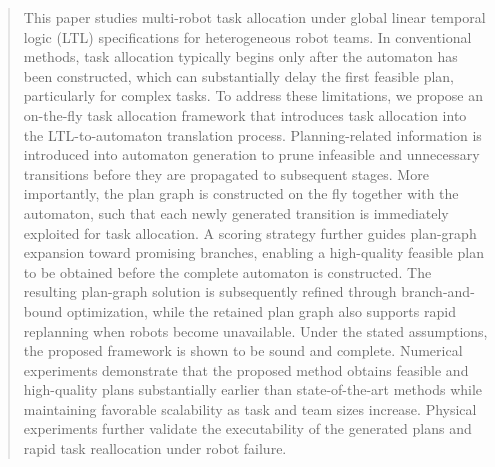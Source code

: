 \documentclass[lettersize,journal]{IEEEtran}
\theoremstyle{italiclemma}
\theoremstyle{italiclemma}
\theoremstyle{definition}
\begin{document}
\begin{abstract}
 This paper studies multi-robot task allocation under global linear temporal logic (LTL) specifications for heterogeneous robot teams. In conventional methods, task allocation typically begins only after the automaton has been constructed, which can substantially delay the first feasible plan, particularly for complex tasks. To address these limitations,  we propose an on-the-fly task allocation framework that introduces task allocation into the LTL-to-automaton translation process. Planning-related information is introduced into automaton generation to prune infeasible and unnecessary transitions before they are propagated to subsequent stages. More importantly, the plan graph is constructed on the fly together with the automaton, such that each newly generated transition is immediately exploited for task allocation. A scoring strategy further guides plan-graph expansion toward promising branches, enabling a high-quality feasible plan to be obtained
before the complete automaton is constructed. The resulting plan-graph solution is subsequently refined through branch-and-bound optimization, while the retained plan graph also supports rapid replanning when robots
become unavailable. Under the stated assumptions, the proposed framework is shown to be sound and complete. Numerical experiments demonstrate that the proposed method obtains feasible and high-quality plans substantially earlier than state-of-the-art methods while maintaining favorable scalability as task and team sizes increase. Physical experiments further validate the executability of the generated plans and rapid task reallocation under robot failure.


\end{abstract}
\end{document}
